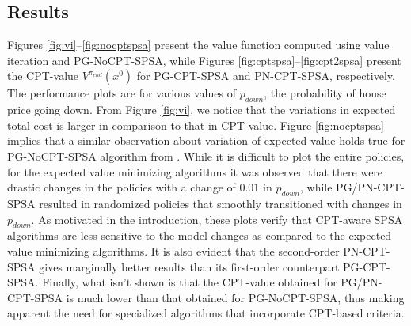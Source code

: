 \documentclass[11pt,letterpaper,english]{article}
\begin{document}
\subsection{Results} Figures \ref{fig:vi}--\ref{fig:nocptspsa} present the value function computed using value iteration and PG-NoCPT-SPSA, while Figures \ref{fig:cptspsa}--\ref{fig:cpt2spsa} present the CPT-value $V^{\pi_{end}}(x^0)$ for PG-CPT-SPSA and PN-CPT-SPSA, respectively. The performance plots are for various values of $p_{down}$, the probability of house price going down. 
From Figure \ref{fig:vi}, we notice that the variations in expected total cost is larger in comparison to that in CPT-value. Figure \ref{fig:nocptspsa} implies that a similar observation about variation of expected value holds true for PG-NoCPT-SPSA algorithm from \cite{bhatnagar2004simultaneous}. While it is difficult to plot the entire policies, for the expected value minimizing algorithms it was observed that there were drastic changes in the policies with a change of $0.01$ in $p_{down}$, while PG/PN-CPT-SPSA resulted in randomized policies that smoothly transitioned with changes in $p_{down}$.
As motivated in the introduction, these plots verify that CPT-aware SPSA algorithms are less sensitive to the model changes as compared to the expected value minimizing algorithms. It is also evident that the second-order PN-CPT-SPSA gives marginally better results than its first-order counterpart PG-CPT-SPSA.
 Finally, what isn't shown is that the CPT-value obtained for PG/PN-CPT-SPSA is much lower than that obtained for PG-NoCPT-SPSA, thus making apparent the need for specialized algorithms that incorporate CPT-based criteria.




\end{document}
